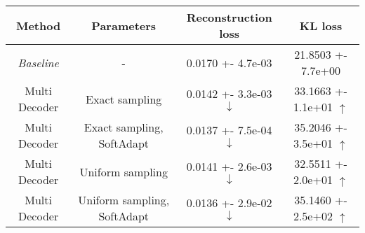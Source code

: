 \centering
\scriptsize
\begin{tabular}{||c|c|c|c||}
\hline
 Method & Parameters & Reconstruction loss & KL loss \\
\hline
\textit{Baseline} & - & 0.0170 +- 4.7e-03 & 21.8503 +- 7.7e+00 \\
\hline
Multi Decoder & Exact sampling & 0.0142 +- 3.3e-03  $\downarrow$ & 33.1663 +- 1.1e+01  $\uparrow$ \\
\hline
Multi Decoder & Exact sampling, SoftAdapt & 0.0137 +- 7.5e-04  $\downarrow$ & 35.2046 +- 3.5e+01  $\uparrow$ \\
\hline
Multi Decoder & Uniform sampling & 0.0141 +- 2.6e-03  $\downarrow$ & 32.5511 +- 2.0e+01  $\uparrow$ \\
\hline
Multi Decoder & Uniform sampling, SoftAdapt & 0.0136 +- 2.9e-02  $\downarrow$ & 35.1460 +- 2.5e+02  $\uparrow$ \\
\hline
\end{tabular}
